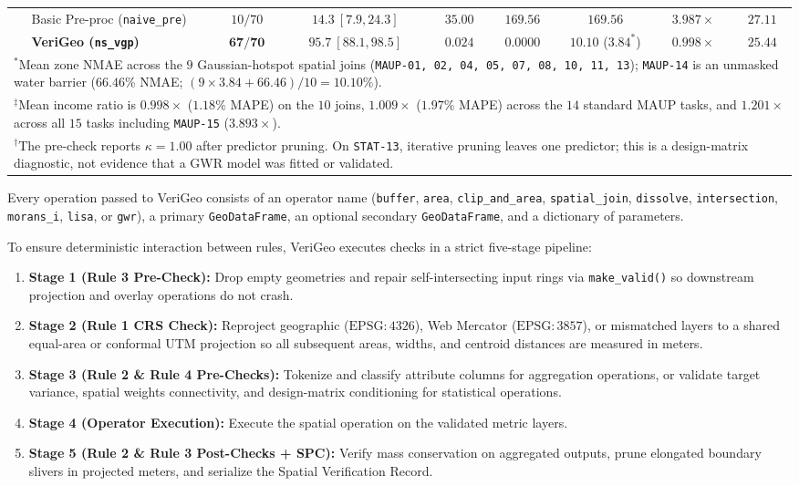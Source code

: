 \documentclass[10pt,twocolumn]{article}
\begin{document}
\begin{table}[t]
{\begin{tabular}{llccccccc}
  & Basic Pre-proc (\texttt{naive\_pre}) & $10/70$ & $14.3\ [7.9, 24.3]$ & $35.00$ & $169.56$ & $169.56$ & $3.987\times$ & $27.11$ \\
  & \textbf{VeriGeo (\texttt{ns\_vgp})} & $\mathbf{67/70}$ & $\mathbf{95.7\ [88.1, 98.5]}$ & $\mathbf{0.024}$ & $\mathbf{0.0000}$ & $\mathbf{10.10}$ ($\mathbf{3.84^*}$) & $\mathbf{0.998\times}$ & $\mathbf{25.44}$ \\
\bottomrule
\multicolumn{9}{l}{\footnotesize $^*$Mean zone NMAE across the $9$ Gaussian-hotspot spatial joins (\texttt{MAUP-01, 02, 04, 05, 07, 08, 10, 11, 13}); \texttt{MAUP-14} is an unmasked water barrier ($66.46\%$ NMAE; $(9\times 3.84 + 66.46)/10 = 10.10\%$).} \\
\multicolumn{9}{l}{\footnotesize $^\ddagger$Mean income ratio is $0.998\times$ ($1.18\%$ MAPE) on the $10$ joins, $1.009\times$ ($1.97\%$ MAPE) across the $14$ standard MAUP tasks, and $1.201\times$ across all $15$ tasks including \texttt{MAUP-15} ($3.893\times$).} \\
\multicolumn{9}{l}{\footnotesize $^\dagger$The pre-check reports $\kappa = 1.00$ after predictor pruning. On \texttt{STAT-13}, iterative pruning leaves one predictor; this is a design-matrix diagnostic, not evidence that a GWR model was fitted or validated.}
\end{tabular}%
}
\end{table}

Every operation passed to VeriGeo consists of an operator name (\texttt{buffer}, \texttt{area}, \texttt{clip\_and\_area}, \texttt{spatial\_join}, \texttt{dissolve}, \texttt{intersection}, \texttt{morans\_i}, \texttt{lisa}, or \texttt{gwr}), a primary \texttt{GeoDataFrame}, an optional secondary \texttt{GeoDataFrame}, and a dictionary of parameters.

To ensure deterministic interaction between rules, VeriGeo executes checks in a strict five-stage pipeline:
\begin{enumerate}
  \item \textbf{Stage 1 (Rule 3 Pre-Check):} Drop empty geometries and repair self-intersecting input rings via \texttt{make\_valid()} so downstream projection and overlay operations do not crash.
  \item \textbf{Stage 2 (Rule 1 CRS Check):} Reproject geographic ($\text{EPSG}:4326$), Web Mercator ($\text{EPSG}:3857$), or mismatched layers to a shared equal-area or conformal UTM projection so all subsequent areas, widths, and centroid distances are measured in meters.
  \item \textbf{Stage 3 (Rule 2 \& Rule 4 Pre-Checks):} Tokenize and classify attribute columns for aggregation operations, or validate target variance, spatial weights connectivity, and design-matrix conditioning for statistical operations.
  \item \textbf{Stage 4 (Operator Execution):} Execute the spatial operation on the validated metric layers.
  \item \textbf{Stage 5 (Rule 2 \& Rule 3 Post-Checks + SPC):} Verify mass conservation on aggregated outputs, prune elongated boundary slivers in projected meters, and serialize the Spatial Verification Record.
\end{enumerate}
\end{document}
